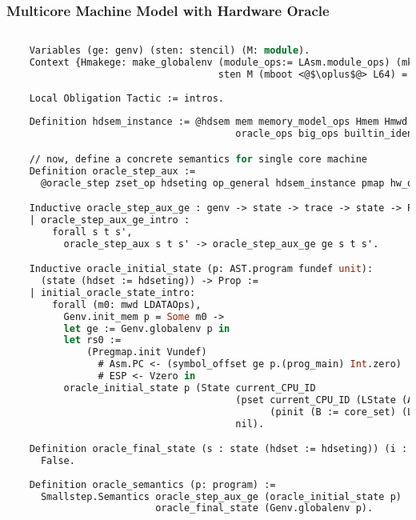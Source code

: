 \subsubsection{Multicore Machine Model with Hardware Oracle}

\begin{lstlisting}[language=Caml]
   
    Variables (ge: genv) (sten: stencil) (M: module).
    Context {Hmakege: make_globalenv (module_ops:= LAsm.module_ops) (mkp_ops:= make_program_ops) 
                                     sten M (mboot <@$\oplus$@> L64) = ret ge}.
    
    Local Obligation Tactic := intros.
    
    Definition hdsem_instance := @hdsem mem memory_model_ops Hmem Hmwd real_params_ops oracle_ops0
                                        oracle_ops big_ops builtin_idents_norepet_prf ge sten M Hmakege.

    // now, define a concrete semantics for single core machine
    Definition oracle_step_aux :=
      @oracle_step zset_op hdseting op_general hdsem_instance pmap hw_oracle.

    Inductive oracle_step_aux_ge : genv -> state -> trace -> state -> Prop :=
    | oracle_step_aux_ge_intro : 
        forall s t s',
          oracle_step_aux s t s' -> oracle_step_aux_ge ge s t s'.

    Inductive oracle_initial_state (p: AST.program fundef unit): 
      (state (hdset := hdseting)) -> Prop := 
    | initial_oracle_state_intro: 
        forall (m0: mwd LDATAOps),
          Genv.init_mem p = Some m0 ->
          let ge := Genv.globalenv p in
          let rs0 :=
              (Pregmap.init Vundef)
                # Asm.PC <- (symbol_offset ge p.(prog_main) Int.zero)
                # ESP <- Vzero in
          oracle_initial_state p (State current_CPU_ID 
                                        (pset current_CPU_ID (LState (Asm.State rs0 m0) true)
                                              (pinit (B := core_set) (LState (Asm.State rs0 m0) false)))
                                        nil).

    Definition oracle_final_state (s : state (hdset := hdseting)) (i : int) : Prop :=
      False.
      
    Definition oracle_semantics (p: program) :=
      Smallstep.Semantics oracle_step_aux_ge (oracle_initial_state p) 
                          oracle_final_state (Genv.globalenv p). 
\end{lstlisting}



